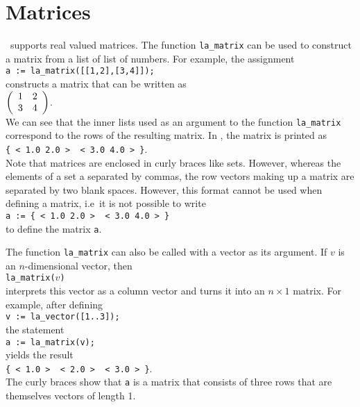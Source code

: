 \section{Matrices}
\setlx\ supports real valued matrices.  The function \texttt{la\_matrix} can be used to construct a
matrix from a list of list of numbers.  For example, the assignment
\\[0.2cm]
\hspace*{1.3cm}
\texttt{a := la\_matrix([[1,2],[3,4]]);}
\\[0.2cm]
constructs a matrix that can be written as
\\[0.2cm]
\hspace*{1.3cm}
$
\left(
\begin{array}[c]{ll}
  1 & 2 \\
  3 & 4
\end{array}
\right)
$.
\\[0.2cm]
We can see that the inner lists used as an argument to the function \texttt{la\_matrix} correspond
to the rows of the resulting matrix.   In \setlx, the matrix is printed as
\\[0.2cm]
\hspace*{1.3cm}
\texttt{\{ < 1.0  2.0 > \ < 3.0  4.0 > \}}.
\\[0.2cm]
Note that matrices are enclosed in curly braces like sets.  However, whereas the elements of a set a
separated by commas, the row vectors making up a matrix are separated by two blank spaces.  However,
this format cannot be used when defining a matrix, i.e~it is not possible to write
\\[0.2cm]
\hspace*{1.3cm}
\texttt{a := \{ < 1.0  2.0 > \ < 3.0  4.0 > \}}
\\[0.2cm]  
to define the matrix \texttt{a}.  

The function \texttt{la\_matrix} can also be called with a vector as its argument.  If $v$ is an
$n$-dimensional vector, then 
\\[0.2cm]
\hspace*{1.3cm}
\texttt{la\_matrix($v$)}
\\[0.2cm]
interprets this vector as a column vector and turns it into an $n \times 1$ matrix.  For example, after
defining
\\[0.2cm]
\hspace*{1.3cm}
\texttt{v := la\_vector([1..3]);}
\\[0.2cm]
the statement 
\\[0.2cm]
\hspace*{1.3cm}
\texttt{a := la\_matrix(v);}
\\[0.2cm]
yields the result
\\[0.2cm]
\hspace*{1.3cm}
\texttt{\{ < 1.0 > \ < 2.0 > \ < 3.0 > \}}.
\\[0.2cm]
The curly braces show that \texttt{a} is a matrix that consists of three rows that are themselves
vectors of length 1.

